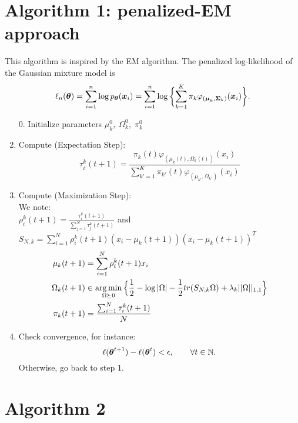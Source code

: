 \section{Algorithm 1: penalized-EM approach}
This algorithm is inspired by the EM algorithm. The penalized log-likelihood of the Gaussian mixture model is
\begin{equation}\label{log-likelihood}
\ell_n({\boldsymbol\theta})=\sum_{i=1}^{n}\log{p_{{\boldsymbol\theta}}(\boldsymbol x_i)}=
\sum_{i=1}^{n}\log\bigg\{{\sum_{k=1}^K\pi_k\varphi_{(\boldsymbol\mu_{k},\boldsymbol\Sigma_{k})}(\boldsymbol x_i)}\bigg\}.
\end{equation}

\begin{enumerate}
\item[0.] Initialize parameters $\mu_k^0,\; \Omega_k^0,\;\pi_k^0$
\item Compute (Expectation Step):
\begin{equation}
\label{posteriorEM}
\tau_i^k(t+1)=\frac{\pi_k(t) \varphi_{(\mu_k(t),\Omega_k(t))}(x_i)}{\sum_{k'=1}^K\pi_{k'}(t)\varphi_{(\mu_{k'},\Omega_{k'})}(x_i)}
\end{equation}

\item Compute (Maximization Step):\\

We note:
\\$\rho^k_i(t+1)=\frac{\tau_i^k(t+1)}{\sum_{j=1}^N\tau_j^k(t+1)}$ and\\
$S_{N,k}=\sum_{i=1}^N \rho^k_i(t+1) (x_i-\mu_k(t+1))(x_i-\mu_k(t+1))^T$\\

\begin{align}
\mu_k(t+1)&=\sum_{i=1}^N \rho^k_i(t+1) x_i\\
\Omega_k(t+1) & \in \operatorname*{arg\,min}_{ \Omega\succeq 0} \Big\{ \frac{1}{2}-\log| \Omega |-\frac{1}{2} tr(S_{N,k}\Omega)+\lambda_k||\Omega||_{1,1}\Big\}\\
\pi_k(t+1)&=\frac{\sum_{i=1}^N\tau_i^k(t+1)}{N}
\end{align}
\item Check convergence, for instance:\\
$$
\ell({\boldsymbol\theta}^{t+1})-\ell({\boldsymbol\theta}^{t})<\epsilon,\qquad \forall t\in{\mathbb N}.
$$
Otherwise, go back to step 1.
\end{enumerate}

\section{Algorithm 2}

